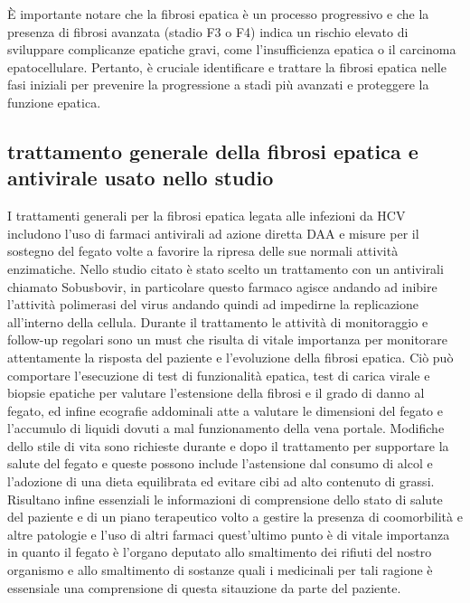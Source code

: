 \documentclass[italian,12pt,a4paper]{article}
\begin{document}
	È importante notare che la fibrosi epatica è un processo progressivo e che la presenza di fibrosi avanzata (stadio F3 o F4) indica un rischio elevato di sviluppare complicanze epatiche gravi, come l'insufficienza epatica o il carcinoma epatocellulare. Pertanto, è cruciale identificare e trattare la fibrosi epatica nelle fasi iniziali per prevenire la progressione a stadi più avanzati e proteggere la funzione epatica.

    \subsection{trattamento generale della fibrosi epatica e antivirale usato nello studio}
	I trattamenti generali per la fibrosi epatica legata alle infezioni da HCV includono l'uso di farmaci antivirali ad azione diretta DAA e misure per il sostegno del fegato volte a favorire la ripresa delle sue normali attività enzimatiche. Nello studio citato è stato scelto un trattamento con un antivirali chiamato Sobusbovir, in particolare questo farmaco agisce andando ad inibire l'attività polimerasi del virus andando quindi ad impedirne la replicazione all'interno della cellula. Durante il trattamento le attività di monitoraggio e follow-up regolari sono un must che risulta di vitale importanza per monitorare attentamente la risposta del paziente e l'evoluzione della fibrosi epatica. Ciò può comportare l'esecuzione di test di funzionalità epatica, test di carica virale e biopsie epatiche per valutare l'estensione della fibrosi e il grado di danno al fegato, ed infine ecografie addominali atte a valutare le dimensioni del fegato e l'accumulo di liquidi dovuti a mal funzionamento della vena portale. Modifiche dello stile di vita sono richieste durante e dopo il trattamento per supportare la salute del fegato e queste possono include l'astensione dal consumo di alcol e l'adozione di una dieta equilibrata ed evitare cibi ad alto contenuto di grassi. Risultano infine essenziali le informazioni di comprensione dello stato di salute del paziente e di un piano terapeutico volto a gestire la presenza di coomorbilità e altre patologie e l'uso di altri farmaci quest'ultimo punto è di vitale importanza in quanto il fegato è l'organo deputato allo smaltimento dei rifiuti del nostro organismo e allo smaltimento di sostanze quali i medicinali per tali ragione è essensiale una comprensione di questa sitauzione da parte del paziente.
    \\
\end{document}

